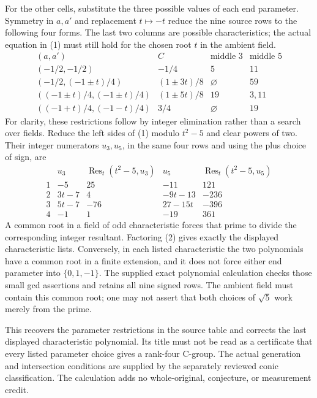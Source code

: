 \documentclass[11pt]{article}
\begin{document}
For the other cells, substitute the three possible values of each end
parameter. Symmetry in $a,a'$ and replacement $t\mapsto-t$ reduce the
nine source rows to the following four forms. The last two columns are
possible characteristics; the actual equation in (1) must still hold
for the chosen root $t$ in the ambient field.
\[
\begin{array}{c|c|c|c}
 (a,a')&C&\text{middle }3&\text{middle }5\\\hline
 (-1/2,-1/2)&-1/4&5&11\\
 (-1/2,(-1\pm t)/4)&(1\pm3t)/8&\varnothing&59\\
 ((-1\pm t)/4,(-1\pm t)/4)&(1\pm5t)/8&19&3,11\\
 ((-1+t)/4,(-1-t)/4)&3/4&\varnothing&19
\end{array}
\]
For clarity, these restrictions follow by integer elimination rather
than a search over fields. Reduce the left sides of (1) modulo $t^2-5$
and clear powers of two. Their integer numerators $u_3,u_5$, in the same four rows and
using the plus choice of sign, are
\[
\begin{array}{c|r|r|r|r}
 &u_3&\operatorname{Res}_t(t^2-5,u_3)
 &u_5&\operatorname{Res}_t(t^2-5,u_5)\\\hline
 1&-5&25&-11&121\\
 2&3t-7&4&-9t-13&-236\\
 3&5t-7&-76&27-15t&-396\\
 4&-1&1&-19&361
\end{array}                                                     \tag{2}
\]
A common root in a field of odd characteristic forces that prime to
divide the corresponding integer resultant. Factoring (2) gives exactly
the displayed characteristic lists. Conversely, in each listed
characteristic the two polynomials have a common root in a finite
extension, and it does not force either end parameter into
$\{0,1,-1\}$. The supplied exact polynomial calculation checks those
small gcd assertions and retains all nine signed rows. The ambient
field must contain this common root; one may not assert that both
choices of $\sqrt5$ work merely from the prime.

This recovers the parameter restrictions in the source table and corrects
the last displayed characteristic polynomial.
Its title must not be read as a certificate that every listed parameter
choice gives a rank-four C-group. The actual generation and intersection
conditions are supplied by the separately reviewed conic classification.
The calculation adds no whole-original, conjecture, or measurement credit.
\end{document}
